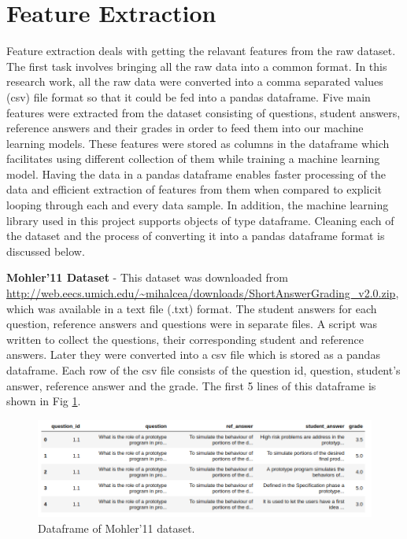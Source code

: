     \section{Feature Extraction}
    
    Feature extraction deals with getting the relavant features from the raw dataset. The first task involves bringing all the raw data into a common format. In this research work, all the raw data were converted into a comma separated values (csv) file format so that it could be fed into a pandas dataframe. Five main features were extracted from the dataset consisting of questions, student answers, reference answers and their grades in order to feed them into our machine learning models. These features were stored as columns in the dataframe which facilitates using different collection of them while training a machine learning model. Having the data in a pandas dataframe enables faster processing of the data and efficient extraction of features from them when compared to explicit looping through each and every data sample. In addition, the machine learning library used in this project supports objects of type dataframe. Cleaning each of the dataset and the process of converting it into a pandas dataframe format is discussed below. 
    
    \textbf{Mohler'11 Dataset} - This dataset was downloaded from \url{http://web.eecs.umich.edu/~mihalcea/downloads/ShortAnswerGrading_v2.0.zip}, which was available in a text file (.txt) format. The student answers for each question, reference answers and questions were in separate files. A script was written to collect the questions, their corresponding student and reference answers. Later they were converted into a csv file which is stored as a pandas dataframe. Each row of the csv file consists of the question id, question, student's answer, reference answer and the grade. The first 5 lines of this dataframe is shown in Fig \ref{mohler_df}.
    
    \begin{figure}[h]
    	\centering
    	\includegraphics[scale=0.4]{images/mohler_df}
    	\caption{Dataframe of Mohler'11 dataset.}
    	\label{mohler_df}
    \end{figure} 
    
